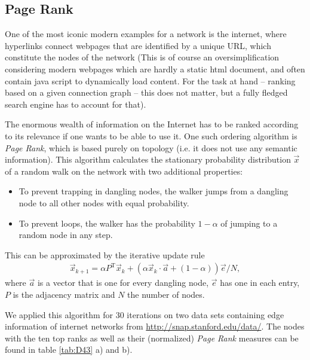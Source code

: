 \documentclass{scrartcl}
\begin{document}
\subsection{Page Rank}
One of the most iconic modern examples for a network is the internet, 
where hyperlinks connect webpages that are identified 
by a unique URL, which constitute the nodes of the network (This is of course
an oversimplification considering modern webpages which are hardly a static 
html document, and often contain java script to dynamically load content. For
the task at hand -- ranking based on a given connection graph -- this does not
matter, but a fully fledged search engine has to account for that).

The enormous wealth of information on the Internet has to be ranked according
to its relevance if one wants to be able to use it. One such ordering algorithm 
is \emph{Page Rank}, which is based purely on topology (i.e. it does not use 
any semantic information). This algorithm calculates the stationary probability 
distribution $\vec{x}$ of a random walk on the network with two additional properties:
\begin{itemize}
 \item To prevent trapping in dangling nodes, the walker jumps from a dangling node
		to all other nodes with equal probability.
 \item To prevent loops, the walker has the probability $1-\alpha$ of jumping to a random	
	node in any step.
\end{itemize}

This can be approximated by the iterative update rule
\begin{align}
	\vec{x}_{k+1} = \alpha P^\mathrm{T} \vec{x}_k + \left(\alpha \vec{x}_k \cdot \vec{a} + (1 - \alpha) \right) \vec{e}/N,
\end{align}
where $\vec{a}$ is a vector that is one for every dangling node, $\vec{e}$
has one in each entry, $P$ is the adjacency matrix and $N$ the number of
nodes.

We applied this algorithm for 30 iterations on two data sets containing
edge information of internet networks from
\url{http://snap.stanford.edu/data/}. The nodes with the ten top ranks as
well as their (normalized) \emph{Page Rank} measures can be found in table
\ref{tab:D43} a) and b).
\end{document}
